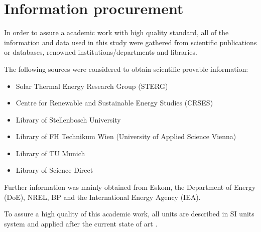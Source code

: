 \section{Information procurement}
In order to assure a academic work with high quality standard, all of the information and data used in this study were gathered from scientific publications or databases, renowned institutions/departments and libraries.

The following sources were considered to obtain scientific provable information:
\begin{itemize}
\item Solar Thermal Energy Research Group (STERG)
\item Centre for Renewable and Sustainable Energy Studies (CRSES)
\item Library of Stellenbosch University
\item Library of FH Technikum Wien (University of Applied Science Vienna)
\item Library of TU Munich
\item Library of Science Direct
\end{itemize}
Further information was mainly obtained from Eskom, the Department of Energy (DoE), NREL, BP and the International Energy Agency (IEA).

To assure a high quality of this academic work, all units are described in SI units system and applied after the current state of art \cite{Blankenburg2011}.


